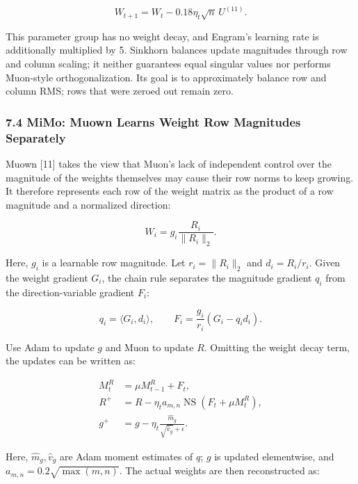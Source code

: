 \documentclass[
  english,
  10pt,
  a4paper,
]{article}
\begin{document}
\nopagebreak[4]

\[
\boxed{W_{t+1}=W_t-0.18\eta_t\sqrt n\,U^{(11)}.}
\tag{30}
\]

This parameter group has no weight decay, and Engram's learning rate is
additionally multiplied by 5. Sinkhorn balances update magnitudes
through row and column scaling; it neither guarantees equal singular
values nor performs Muon-style orthogonalization. Its goal is to
approximately balance row and column RMS; rows that were zeroed out
remain zero.

\subsubsection{7.4 MiMo: Muown Learns Weight Row Magnitudes
Separately}\label{mimo-muown-learns-weight-row-magnitudes-separately}

Muown {[}11{]} takes the view that Muon's lack of independent control
over the magnitude of the weights themselves may cause their row norms
to keep growing. It therefore represents each row of the weight matrix
as the product of a row magnitude and a normalized direction:

\nopagebreak[4]

\[
W_i=g_i\frac{R_i}{\|R_i\|_2}.
\tag{31}
\]

Here, \(g_i\) is a learnable row magnitude. Let \(r_i=\|R_i\|_2\) and
\(d_i=R_i/r_i\). Given the weight gradient \(G_i\), the chain rule
separates the magnitude gradient \(q_i\) from the direction-variable
gradient \(F_i\):

\nopagebreak[4]

\[
q_i=\langle G_i,d_i\rangle,\qquad
F_i=\frac{g_i}{r_i}(G_i-q_id_i).
\tag{32}
\]

Use Adam to update \(g\) and Muon to update \(R\). Omitting the weight
decay term, the updates can be written as:

\nopagebreak[4]

\[
\begin{aligned}
M_t^R&=\mu M_{t-1}^R+F_t,\\
R^+&=R-\eta_ta_{m,n}\operatorname{NS}(F_t+\mu M_t^R),\\
g^+&=g-\eta_t\frac{\widehat m_g}{\sqrt{\widehat v_g}+\epsilon}.
\end{aligned}
\tag{33}
\]

Here, \(\widehat m_g,\widehat v_g\) are Adam moment estimates of \(q\);
\(g\) is updated elementwise, and \(a_{m,n}=0.2\sqrt{\max(m,n)}\). The
actual weights are then reconstructed as:
\end{document}
